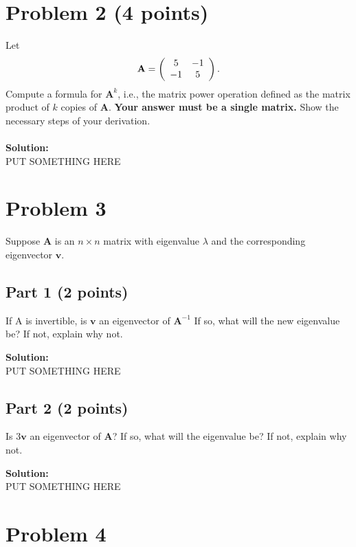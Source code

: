 \documentclass[11pt, oneside]{article}   	%
\begin{document}
\section*{Problem 2 (4 points)}

Let 
\[
{\mathbf{A}} = \left( {\begin{array}{*{20}c}
   5 & { - 1}  \\
   { - 1} & 5  \\

 \end{array} } \right).
\]
Compute a formula for ${\mathbf{A}}^k$, i.e., the matrix power operation defined as the matrix product of $k$ copies of ${\mathbf{A}}$. \textbf{Your answer must be a single matrix.} Show the necessary steps of your derivation.
\\ \\
\textbf{Solution:}\\
PUT SOMETHING HERE 

\section*{Problem 3}

Suppose $\mathbf{A}$ is an $n \times n$ matrix with eigenvalue $\lambda$ and the corresponding eigenvector $\mathbf{v}$.

\subsection*{Part 1 (2 points)}
If A is invertible, is $\mathbf{v}$ an eigenvector of $\mathbf{A}^{-1}$ If so, what will the new eigenvalue be? If not, explain why not.

\textbf{Solution:}\\
PUT SOMETHING HERE 


\subsection*{Part 2  (2 points)}
Is $3\mathbf{v}$ an eigenvector of $\mathbf{A}$? If so, what will the eigenvalue be? If not, explain why not.

\textbf{Solution:}\\
PUT SOMETHING HERE 

\section*{Problem 4}
\end{document}
